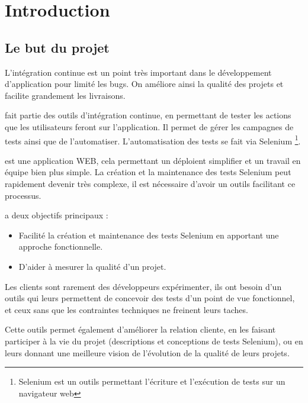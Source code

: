 \newpage{}
\chapter{Introduction}

\section{Le but du projet}

L'intégration continue est un point très important dans le développement d'application pour limité
les bugs. On améliore ainsi la qualité des projets et facilite grandement les livraisons. 

\youTestIt{} fait partie des outils d'intégration continue, en permettant de tester les actions que les
utilisateurs feront sur l'application. Il permet de gérer les campagnes de tests ainsi que de l'automatiser.
L'automatisation des tests se fait via Selenium \footnote{Selenium est un outils permettant l'écriture et
l’exécution de tests sur un navigateur web}. 


\youTestIt{}  est une application WEB, cela permettant un déploient simplifier et un travail en équipe bien
plus simple. La création et la maintenance des tests Selenium peut rapidement devenir très complexe,
il est nécessaire d'avoir un outils facilitant ce processus.

\youTestIt{} a deux objectifs principaux :
\begin{itemize}
	\item Facilité la création et maintenance des tests Selenium  en apportant une approche fonctionnelle.
	\item D'aider à mesurer la qualité d'un projet.
\end{itemize}



Les clients sont rarement des développeurs expérimenter, ils ont besoin d'un outils
qui leurs permettent de concevoir des tests d'un point de vue fonctionnel, et ceux
sans que les contraintes techniques ne freinent leurs taches. 

Cette outils permet également d'améliorer la relation cliente, en les faisant participer
à la vie du projet (descriptions et conceptions de tests Selenium), ou en leurs donnant 
une meilleure vision de l'évolution de la qualité de leurs projets. 

